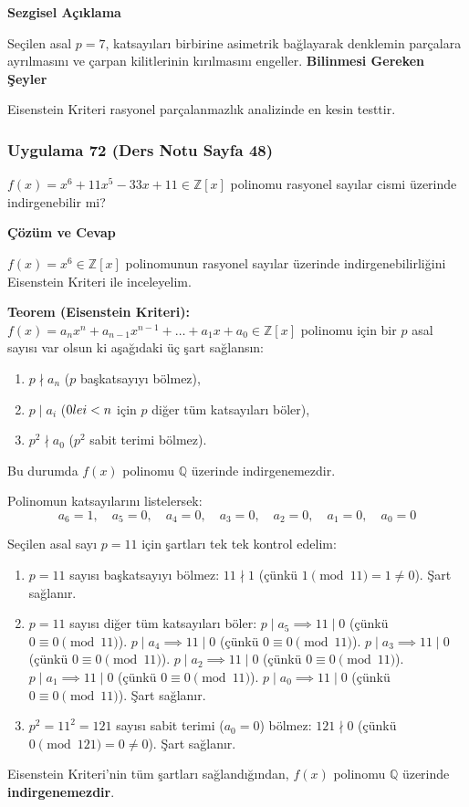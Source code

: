 \documentclass[11pt, a4paper]{article}
\newenvironment{cozum}{
    \vspace{0.5cm}
    \noindent\textcolor{green!60!black}{\faCheckCircle\enspace \textbf{\Large Çözüm ve Cevap}}\par\vspace{0.2cm}
}{}
\newenvironment{sezgisel}{
    \vspace{0.5cm}
    \noindent\textcolor{orange!80!black}{\faLightbulb\enspace \textbf{\Large Sezgisel Açıklama}}\par\vspace{0.2cm}
    \itshape
}{}
\newenvironment{bilgi}{
    \vspace{0.5cm}
    \noindent\textcolor{red!70!black}{\faExclamationTriangle\enspace \textbf{\Large Bilinmesi Gereken Şeyler}}\par\vspace{0.2cm}
}{}
\begin{document}
\begin{sezgisel}
Seçilen asal $p=7$, katsayıları birbirine asimetrik bağlayarak denklemin parçalara ayrılmasını ve çarpan kilitlerinin kırılmasını engeller.
\end{sezgisel}
\begin{bilgi}
Eisenstein Kriteri rasyonel parçalanmazlık analizinde en kesin testtir.
\end{bilgi}

\newpage
\subsubsection{Uygulama 72 (Ders Notu Sayfa 48)}
\begin{sorubox}
$f(x) = x^6 + 11x^5 - 33x + 11 \in \mathbb{Z}[x]$ polinomu rasyonel sayılar cismi üzerinde indirgenebilir mi?
\end{sorubox}
\begin{cozum}
$f(x) = x^{6} \in \mathbb{Z}[x]$ polinomunun rasyonel sayılar üzerinde indirgenebilirliğini Eisenstein Kriteri ile inceleyelim.

\textbf{Teorem (Eisenstein Kriteri):} $f(x) = a_n x^n + a_{n-1} x^{n-1} + \dots + a_1 x + a_0 \in \mathbb{Z}[x]$ polinomu için bir $p$ asal sayısı var olsun ki aşağıdaki üç şart sağlansın:
\begin{enumerate}
    \item $p \nmid a_n$ ($p$ başkatsayıyı bölmez),
    \item $p \mid a_i$ ($0 \\le i < n$ için $p$ diğer tüm katsayıları böler),
    \item $p^2 \nmid a_0$ ($p^2$ sabit terimi bölmez).
\end{enumerate}
Bu durumda $f(x)$ polinomu $\mathbb{Q}$ üzerinde indirgenemezdir.

Polinomun katsayılarını listelersek:
\[ a_{6} = 1, \quad a_{5} = 0, \quad a_{4} = 0, \quad a_{3} = 0, \quad a_{2} = 0, \quad a_{1} = 0, \quad a_{0} = 0 \]

Seçilen asal sayı $p = 11$ için şartları tek tek kontrol edelim:
\begin{enumerate}
    \item $p = 11$ sayısı başkatsayıyı bölmez: $11 \nmid 1$ (çünkü $1 \pmod{11} = 1 \neq 0$). Şart sağlanır.
    \item $p = 11$ sayısı diğer tüm katsayıları böler:
    $p \mid a_{5} \implies 11 \mid 0$ (çünkü $0 \equiv 0 \pmod{11}$).
    $p \mid a_{4} \implies 11 \mid 0$ (çünkü $0 \equiv 0 \pmod{11}$).
    $p \mid a_{3} \implies 11 \mid 0$ (çünkü $0 \equiv 0 \pmod{11}$).
    $p \mid a_{2} \implies 11 \mid 0$ (çünkü $0 \equiv 0 \pmod{11}$).
    $p \mid a_{1} \implies 11 \mid 0$ (çünkü $0 \equiv 0 \pmod{11}$).
    $p \mid a_{0} \implies 11 \mid 0$ (çünkü $0 \equiv 0 \pmod{11}$).
    Şart sağlanır.
    \item $p^2 = 11^2 = 121$ sayısı sabit terimi ($a_0 = 0$) bölmez: $121 \nmid 0$ (çünkü $0 \pmod{121} = 0 \neq 0$). Şart sağlanır.
\end{enumerate}

Eisenstein Kriteri'nin tüm şartları sağlandığından, $f(x)$ polinomu $\mathbb{Q}$ üzerinde \textbf{indirgenemezdir}.
\end{cozum}
\end{document}
